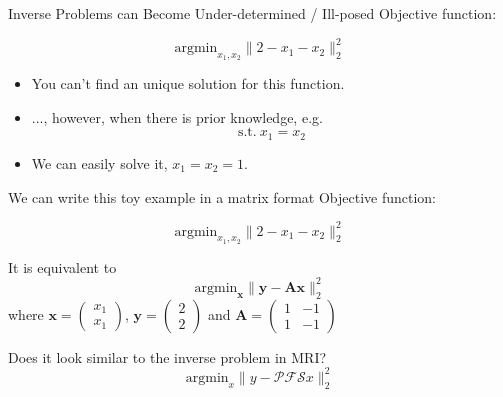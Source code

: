 \begin{frame}{Inverse Problems can Become Under-determined / Ill-posed}
	Objective function:

	\begin{equation}
		\mathrm{argmin}_{x_1, x_2} \lVert 2 - x_1 - x_2 \rVert_2^2
	\end{equation}

	\vfill

	\begin{itemize}
		\item <1-> You can't find an unique solution for this function.
		\vspace{1em}
		\item <2->..., however, when there is prior knowledge, e.g. \\
		\begin{equation}
			\mathrm{s.t.}~x_1 = x_2
		\end{equation}

		\item <3-> We can easily solve it, $x_1 = x_2 = 1$.
	\end{itemize}

\end{frame}


\begin{frame}{We can write this toy example in a matrix format}
	Objective function:

	\begin{equation}
		\mathrm{argmin}_{x_1, x_2} \lVert 2 - x_1 - x_2 \rVert_2^2
	\end{equation}

	\vspace{1em}

	It is equivalent to
	\begin{equation}
		\mathrm{argmin}_{\mathbf{x}} \lVert \mathbf{y} - \mathbf{A} \mathbf{x} \rVert_2^2
	\end{equation}
	\hspace{1em} where $\mathbf{x} = \begin{pmatrix}
		x_1 \\ x_1
	\end{pmatrix}$, $\mathbf{y} = \begin{pmatrix}
	2 \\ 2
	\end{pmatrix}$ and
	$\mathbf{A} = \begin{pmatrix}
		1 & -1 \\
		1 & -1
	\end{pmatrix}$

	\vspace{3em}
	Does it look similar to the inverse problem in MRI?
	\begin{equation}
		\mathrm{argmin}_x \lVert y -  \mathcal{P} \mathcal{F} \mathcal{S} x \rVert_2^2
	\end{equation}
\end{frame}



